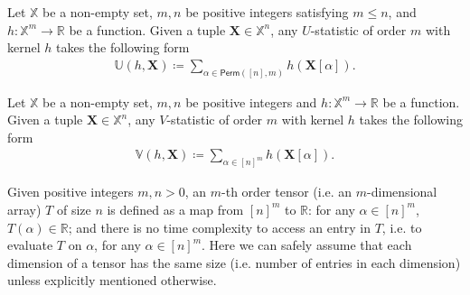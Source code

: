 \documentclass[twoside,11pt]{article}
\newcommand{\Zhang}[1]{{\color{blue}{Zhang: #1}}}
\newcommand{\ustat}{\mathbb{U}}
\newcommand{\vstat}{\mathbb{V}}
\newcommand{\ustatp}[2]{\ustat(#1,#2)}
\newcommand{\vstatp}[2]{\vstat(#1,#2)}
\newcommand{\perm}[1]{\mathsf{Perm}(#1)}
\def\bbX{\mathbb{X}}
\def\bbR{\mathbb{R}}
\newcommand{\reals}{{\mathbb{R}}}
\begin{document}
\begin{definition}[$U$-Statistic]\label{def:u_stat}
Let $\bbX$ be a non-empty set, $m, n$ be positive integers satisfying $m \leq n$, and $h: \bbX^{m} \rightarrow \bbR$ be a function. Given a tuple $\bm{X} \in \bbX^n$, any $U$-statistic of order $m$ with kernel $h$ takes the following form 
    \begin{align*}
        \ustatp{h}{\bm{X}} \coloneqq \sum_{\alpha \in \perm{[n],m}} h(\bm{X}[\alpha]). 
    \end{align*}
\end{definition}

\begin{definition}[$V$-Statistic]\label{def:v_stat}
Let $\bbX$ be a non-empty set, $m, n$ be positive integers and $h: \bbX^{m} \rightarrow \bbR$ be a function. Given a tuple $\bm{X} \in \bbX^n$, any $V$-statistic of order $m$ with kernel $h$ takes the following form 
    \begin{align*}
        \vstatp{h}{\bm{X}} \coloneqq \sum_{\alpha \in [n]^m} h(\bm{X}[\alpha]). 
    \end{align*} 
\end{definition}

\begin{definition}[Tensor]
\label{def:tensors}
Given positive integers $m, n > 0$, an $m$-th order tensor (i.e. an $m$-dimensional array) $T$ of size $n$ is defined as a map from $[n]^m$ to $\reals$: for any $\alpha \in [n]^{m}$, $T (\alpha) \in \bbR$; and there is no time complexity to access an entry in $T$, i.e. to evaluate $T$ on $\alpha$, for any $\alpha \in [n]^{m}$. Here we can safely assume that each dimension of a tensor has the same size (i.e. number of entries in each dimension) unless explicitly mentioned otherwise.
\end{definition}
\end{document}
